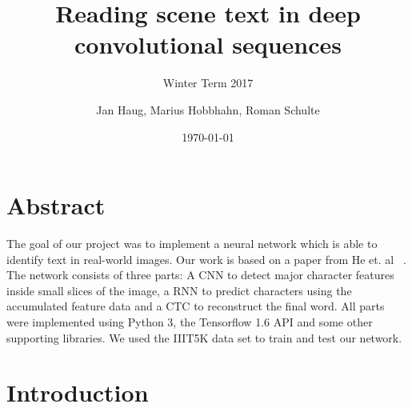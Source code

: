 \documentclass{utue} %
\title{Reading scene text in deep convolutional sequences}
\author{Jan Haug, Marius Hobbhahn, Roman Schulte}
\date{\today}
\subtitle{Winter Term 2017}
\begin{document}
	



\maketitle

\section*{Abstract}
The goal of our project was to implement a neural network which is able to identify text in real-world images.
Our work is based on a paper from He et. al ~\cite{2015arXiv150604395H}. The network consists of three parts: A CNN to detect major character features inside small slices of the image, a RNN to predict characters using the accumulated feature data and a CTC to reconstruct the final word. All parts were implemented using Python 3, the Tensorflow 1.6 API and some other supporting libraries. We used the IIIT5K data set to train and test our network.

\section{Introduction}
\end{document}
